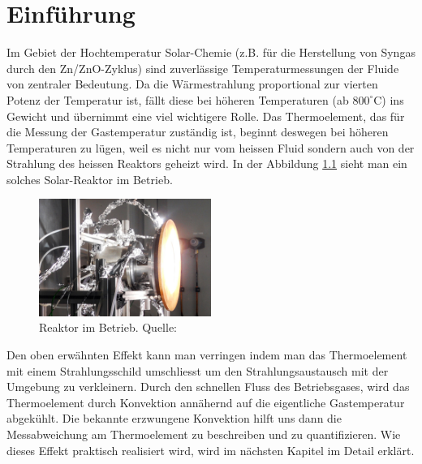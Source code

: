 \chapter{Einführung}\label{sec:introduction}

Im Gebiet der Hochtemperatur Solar-Chemie (z.B. für die Herstellung von Syngas durch den Zn/ZnO-Zyklus) sind zuverlässige Temperaturmessungen der Fluide von zentraler Bedeutung. Da die Wärmestrahlung proportional zur vierten Potenz der Temperatur ist, fällt diese bei höheren Temperaturen (ab $800^\circ$C) ins Gewicht und übernimmt eine viel wichtigere Rolle. Das Thermoelement, das für die Messung der Gastemperatur zuständig ist, beginnt deswegen bei höheren Temperaturen zu lügen, weil es nicht nur vom heissen Fluid sondern auch von der Strahlung des heissen Reaktors geheizt wird. In der Abbildung \ref{fig:reactor} sieht man ein solches Solar-Reaktor im Betrieb.\\


\begin{figure}[H]
\centering
\includegraphics[width=0.5\textwidth]{pics/solar_reactor.png}
\caption{Reaktor im Betrieb. Quelle: \cite{caltech}}
\label{fig:reactor}
\end{figure}

Den oben erwähnten Effekt kann man verringen indem man das Thermoelement mit einem Strahlungsschild umschliesst um den Strahlungsaustausch mit der Umgebung zu verkleinern. Durch den schnellen Fluss des Betriebsgases, wird das Thermoelement durch Konvektion annähernd auf die eigentliche Gastemperatur abgekühlt. Die bekannte erzwungene Konvektion hilft uns dann die Messabweichung am Thermoelement zu beschreiben und zu quantifizieren. Wie dieses Effekt praktisch realisiert wird, wird im nächsten Kapitel im Detail erklärt. 